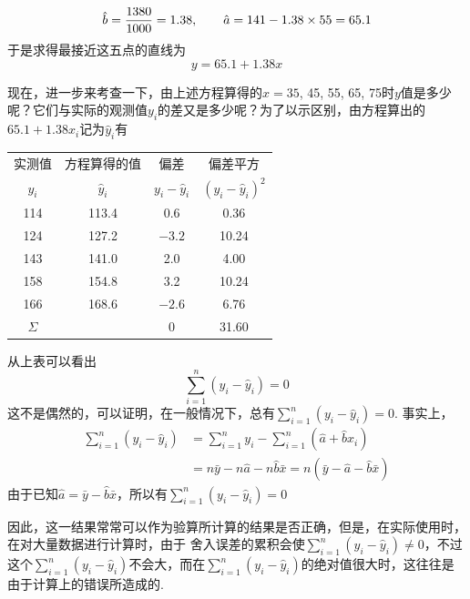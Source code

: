 \[\hat b=\dfrac{1380}{1000}=1.38,\qquad \hat a=141-1.38\times 55=65.1\]
于是求得最接近这五点的直线为
\[y=65.1+1.38x\]

现在，进一步来考查一下，由上述方程算得的$x=35$, 45, 55, 65, 75时$y$值是多少呢？它们与实际的观测值$y_i$的差又是多少呢？为了以示区别，由方程算出的$65.1+1.38x_i$记为$\hat y_i$有

\begin{center}
\begin{tabular}{cccc}
\hline
实测值&方程算得的值& 偏差& 偏差平方\\
$y_i$&$\hat y_i$&$y_i-\hat y_i$&$\left(y_i-\hat y_i\right)^2$\\
\hline
114&113.4&0.6&0.36\\
124&127.2&$-3.2$&10.24\\
143&141.0&2.0&4.00\\
158&154.8&3.2&10.24\\
166&168.6&$-2.6$&6.76\\
\hline
$\Sigma$&&0&31.60\\
\hline
\end{tabular}
\end{center}

从上表可以看出
\[\sum^n_{i=1}\left(y_i-\hat y_i\right)=0\]
这不是偶然的，可以证明，在一般情况下，总有$\sum\limits^n_{i=1}\left(y_i-\hat y_i\right)=0$. 事实上，
\[\begin{split}
\sum^n_{i=1}\left(y_i-\hat y_i\right)&=\sum^n_{i=1}y_i-\sum^n_{i=1}\left(\hat a+\hat b x_i\right)    \\
&=n\bar y -n\hat a-n\hat b \bar x=n\left(\bar y-\hat a-\hat b \bar x\right)
\end{split} \]
由于已知$\hat a=\bar y-\hat b\bar x$，所以有$\sum\limits^n_{i=1}\left(y_i-\hat y_i\right)=0$


因此，这一结果常常可以作为验算所计算的结果是否正确，但是，在实际使用时，在对大量数据进行计算时，由于
舍入误差的累积会使$\sum\limits^n_{i=1}\left(y_i-\hat y_i\right)\ne 0$，不过这个$\sum\limits^n_{i=1}\left(y_i-\hat y_i\right)$不会大，而在$\sum\limits^n_{i=1}\left(y_i-\hat y_i\right)$的绝对值很大时，这往往是由于计算上的错误所造成的.

